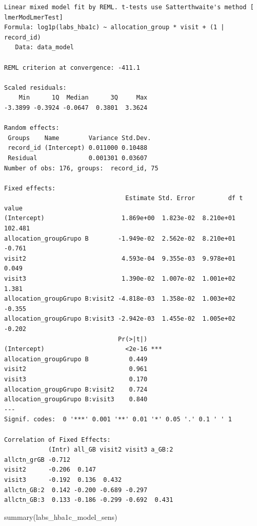 \documentclass[
  letterpaper,
  DIV=11,
  numbers=noendperiod]{scrartcl}
\newenvironment{Shaded}{\begin{snugshade}}{\end{snugshade}}
\newcommand{\FunctionTok}[1]{\textcolor[rgb]{0.28,0.35,0.67}{#1}}
\newcommand{\NormalTok}[1]{\textcolor[rgb]{0.00,0.23,0.31}{#1}}
\begin{document}
\begin{verbatim}
Linear mixed model fit by REML. t-tests use Satterthwaite's method [
lmerModLmerTest]
Formula: log1p(labs_hba1c) ~ allocation_group * visit + (1 | record_id)
   Data: data_model

REML criterion at convergence: -411.1

Scaled residuals: 
    Min      1Q  Median      3Q     Max 
-3.3899 -0.3924 -0.0647  0.3801  3.3624 

Random effects:
 Groups    Name        Variance Std.Dev.
 record_id (Intercept) 0.011000 0.10488 
 Residual              0.001301 0.03607 
Number of obs: 176, groups:  record_id, 75

Fixed effects:
                                 Estimate Std. Error         df t value
(Intercept)                     1.869e+00  1.823e-02  8.210e+01 102.481
allocation_groupGrupo B        -1.949e-02  2.562e-02  8.210e+01  -0.761
visit2                          4.593e-04  9.355e-03  9.978e+01   0.049
visit3                          1.390e-02  1.007e-02  1.001e+02   1.381
allocation_groupGrupo B:visit2 -4.818e-03  1.358e-02  1.003e+02  -0.355
allocation_groupGrupo B:visit3 -2.942e-03  1.455e-02  1.005e+02  -0.202
                               Pr(>|t|)    
(Intercept)                      <2e-16 ***
allocation_groupGrupo B           0.449    
visit2                            0.961    
visit3                            0.170    
allocation_groupGrupo B:visit2    0.724    
allocation_groupGrupo B:visit3    0.840    
---
Signif. codes:  0 '***' 0.001 '**' 0.01 '*' 0.05 '.' 0.1 ' ' 1

Correlation of Fixed Effects:
            (Intr) all_GB visit2 visit3 a_GB:2
allctn_grGB -0.712                            
visit2      -0.206  0.147                     
visit3      -0.192  0.136  0.432              
allctn_GB:2  0.142 -0.200 -0.689 -0.297       
allctn_GB:3  0.133 -0.186 -0.299 -0.692  0.431
\end{verbatim}

\begin{Shaded}
\begin{Highlighting}[]
\FunctionTok{summary}\NormalTok{(labs\_hba1c\_model\_sens)}
\end{Highlighting}
\end{Shaded}
\end{document}
